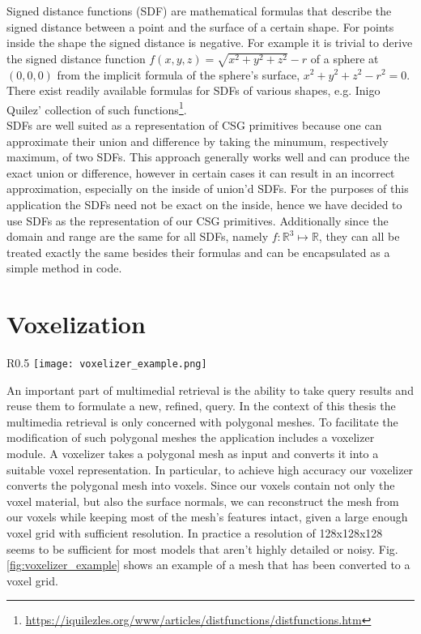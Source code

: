 Signed distance functions (SDF) are mathematical formulas that describe the signed distance between a point and the surface of a certain shape. For points inside the shape the
signed distance is negative. For example it is trivial to derive the signed distance function $f(x,y,z) = \sqrt{x^2 + y^2 + z^2} - r$ of a sphere at $(0, 0, 0)$ from the implicit formula of the sphere's surface, $x^2 + y^2 + z^2 - r^2 = 0$. There exist readily available formulas for SDFs of various shapes, e.g. Inigo Quilez' collection of such functions\footnote{\url{https://iquilezles.org/www/articles/distfunctions/distfunctions.htm}}.\\
SDFs are well suited as a representation of CSG primitives because one can approximate their union and difference by taking the minumum, respectively maximum, of two SDFs. This approach generally works
well and can produce the exact union or difference, however in certain cases it can result in an incorrect approximation, especially on the inside of union'd SDFs. For the purposes of this application the
SDFs need not be exact on the inside, hence we have decided to use SDFs as the representation of our CSG primitives. Additionally since the domain and range are the same for all SDFs, namely
$f\colon \mathbb{R}^3 \mapsto \mathbb{R}$, they can all be treated exactly the same besides their formulas and can be encapsulated as a simple method in code.

\section{Voxelization}

\begin{wrapfigure}{R}{0.5\textwidth}
\texttt{[image: voxelizer\_example.png]}
\caption{The Stanford Armadillo mesh\protect\footnotemark  (left) and its voxel representation at a resolution of 128x128x128 voxels (right).}
\label{fig:voxelizer_example}
\end{wrapfigure}

An important part of multimedial retrieval is the ability to take query results and reuse them to formulate a new, refined, query. In the context of this thesis the multimedia retrieval
is only concerned with polygonal meshes. To facilitate the modification of such polygonal meshes the application includes a voxelizer module. A voxelizer takes a polygonal
mesh as input and converts it into a suitable voxel representation. In particular, to achieve high accuracy our voxelizer converts the polygonal mesh into voxels. Since
our voxels contain not only the voxel material, but also the surface normals, we can reconstruct the mesh from our voxels while keeping most of the mesh's features intact, given
a large enough voxel grid with sufficient resolution. In practice a resolution of 128x128x128 seems to be sufficient for most models that aren't highly detailed or noisy.
Fig. \ref{fig:voxelizer_example} shows an example of a mesh that has been converted to a voxel grid.

